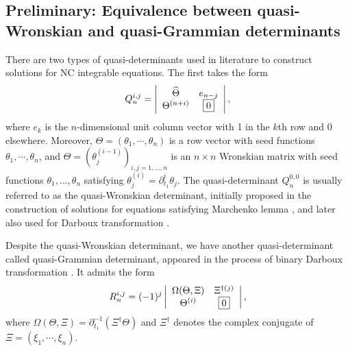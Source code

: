 \documentclass[11p,reqno]{amsart}
\numberwithin{equation}{section}
\numberwithin{equation}{section}
\begin{document}
\subsection{Preliminary: Equivalence between quasi-Wronskian and quasi-Grammian determinants}
There are two types of quasi-determinants used in literature to construct solutions for NC integrable equations. The first takes the form
\begin{equation}
    Q_n^{i, j} =
\left|
\begin{array}{cc}
    \widehat{\Theta} & e_{n-j} \\
    \Theta^{(n+i)} & \fbox{0}
\end{array}
\right|,
\end{equation}
where $e_k$ is the $n$-dimensional unit column vector with 1 in the $k$th row and 0 elsewhere. Moreover, $\Theta=(\theta_1,\cdots,\theta_n)$ is a row vector with seed functions $\theta_1,\cdots,\theta_n$, and $\widehat{\Theta} = \left( \theta_{j}^{(i-1)} \right)_{i,j=1,\dots,n}$ is an $n \times n$ Wronskian matrix with seed functions $\theta_1, \ldots, \theta_n$ satisfying $\theta_j^{(i)}=\partial_{t_1}^i \theta_j$.
The quasi-determinant $Q_n^{0, 0}$ is usually referred to as the quasi-Wronskian determinant, initially proposed in the construction of solutions for equations satisfying Marchenko lemma \cite{etingof97}, and later also used for Darboux transformation \cite{gelfand05}.

Despite the quasi-Wronskian determinant, we have another quasi-determinant called quasi-Grammian determinant, appeared in the process of binary Darboux transformation \cite{gilson07}. It admits the form
\begin{equation} \label{quasigrammian}
    R_n^{i, j} = (-1)^j
\left|
\begin{array}{cc}
    \Omega(\Theta, \Xi) & \Xi^{\dagger (j)} \\
    \Theta^{(i)} & \fbox{0}
\end{array}
\right|,
\end{equation}
where $\Omega(\Theta, \Xi) = \partial_{t_1}^{-1} (\Xi^{\dagger} \Theta)$ and $\Xi^{\dagger}$ denotes the complex conjugate of $\Xi=(\xi_1,\cdots,\xi_n)$. 
\end{document}
